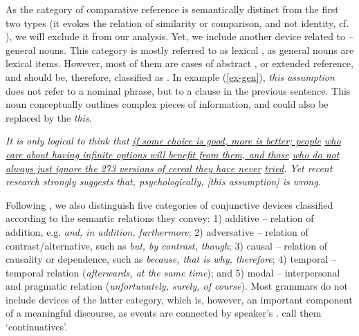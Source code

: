 \documentclass[output=paper]{langsci/langscibook.cls}
\begin{document}
As the category of comparative reference is semantically distinct from the first two types (it evokes the relation of similarity or comparison, and not identity, cf. \citet{HallidayMatthiessen2004}), we will exclude it from our analysis. Yet, we include another device related to  -- {\sc general nouns}. This category is mostly referred to as lexical , as general nouns are lexical items. However, most of them are cases of abstract  \citep[see][]{ZinsmeisterEtAl2012}, or extended reference, and should be, therefore, classified as . In example (\ref{ex-gen}),  \textsl{this assumption} does not refer to a nominal phrase, but to a clause in the previous sentence. This noun conceptually outlines complex pieces of information, and could also be replaced by the   \textsl{this}.
 
\ea
\label{ex-gen}
\textit{It is only logical to think that \underline{if some choice is good, more is better; people} \underline{who care about having infinite options will benefit from them, and those} \underline{who do not always  just ignore the 273 versions of cereal they have never} \underline{tried}. Yet recent research strongly suggests that, psychologically, [this  assumption] is wrong.}
\z

Following \citet{HallidayHasan1976}, we also distinguish five categories of conjunctive devices classified according to the semantic relations they convey: 1) additive -- relation of addition, e.g.  \textsl{and, in addition, furthermore}; 2) adversative -- relation of contrast/alternative, such as  \textsl{but, by contrast, though}; 3) causal -- relation of causality or dependence, such as  \textsl{because, that is why, therefore}; 4) temporal -- temporal relation (\textsl{afterwards, at the same time}); and 5) modal -- interpersonal and pragmatic relation (\textsl{unfortunately, surely, of course}). Most grammars do not include devices of the latter category, which is, however, an important component of a meaningful discourse, as events are connected by speaker's . \citet{HallidayHasan1976} call them `continuatives'.
\end{document}
